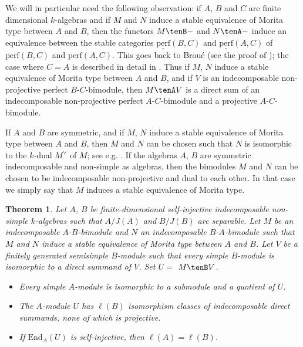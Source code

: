 \documentclass{amsart}
\theoremstyle{plain}\newtheorem{Theorem}{Theorem}[section]
\theoremstyle{plain}\newtheorem{Conjecture}[Theorem]{Conjecture}
\theoremstyle{plain}\newtheorem{Corollary}[Theorem]{Corollary}
\theoremstyle{plain}\newtheorem{Lemma}[Theorem]{Lemma}
\theoremstyle{plain}\newtheorem{Proposition}[Theorem]{Proposition}
\theoremstyle{definition}\newtheorem{Definition}[Theorem]{Definition}
\theoremstyle{definition}\newtheorem{Example}[Theorem]{Example}
\theoremstyle{definition}\newtheorem{Examples}[Theorem]{Examples}
\theoremstyle{definition}\newtheorem{Exercise}[Theorem]{Exercise}
\theoremstyle{definition}\newtheorem{Notation}[Theorem]{Notation}
\theoremstyle{definition}\newtheorem{Remark}[Theorem]{Remark}
\theoremstyle{definition}\newtheorem{Remarks}[Theorem]{Remarks}
\theoremstyle{plain}\newtheorem{Statement}[Theorem]{}
\def\End{\mathrm{End}}
\def\perf{\mathrm{perf}}
\def\perfbar{\underline{\mathrm{perf}}}
\begin{document}
We will in particular need the following observation:  if  $A$, $B$ and $C$  
are finite dimensional $k$-algebras and  if $M$ and  $N$ induce a  stable 
equivalence of Morita type between $A$ and $B$, 
then the functors  $M\tenB-$ and $N\tenA -$  induce an equivalence between 
the stable categories $\perfbar(B,C)$ and $\perfbar(A,C)$ of $\perf(B,C)$ and 
$\perf(A,C)$. This goes back to Brou\'e (see the proof of \cite[5.4]{Broue94}); the 
case where $C=A$ is described in detail in \cite[Proposition 2.17.11]{LiBookI}. 
Thus if $M$, $N$ induce a stable equivalence of
Morita type between $A$ and $B$,  and if $V$ is an indecomposable non-projective 
perfect $B$-$C$-bimodule,  then $M\tenA V$ is a direct sum of an indecomposable 
non-projective  perfect $A$-$C$-bimodule and a projective $A$-$C$-bimodule. 


If $A$ and $B$ are symmetric, and if $M$, $N$ induce a stable equivalence of 
Morita type between $A$ and $B$, then $M$ and $N$ can be chosen such that $N$ 
is isomorphic to  the $k$-dual $M^\vee$ of $M$; see e.g. 
\cite[Proposition 2.17.5]{LiBookI}.
If the algebras $A$, $B$ are symmetric indecomposable and non-simple as algebras,
then the bimodules $M$ and $N$ can be chosen to be indecomposable 
non-projective and dual to each other. In that case we simply say that $M$ 
induces a stable equivalence of Morita type. 


\begin{Theorem} \label{simpleminded-Thm}
Let $A$, $B$ be finite-dimensional self-injective indecomposable non-simple
$k$-algebras such that $A/J(A)$ and $B/J(B)$ are separable.
Let $M$ be an indecomposable $A$-$B$-bimodule and $N$ an indecomposable
$B$-$A$-bimodule such that $M$ and $N$ induce a stable equivalence
of Morita type between $A$ and $B$. Let $V$ be a finitely generated semisimple
$B$-module such that every simple $B$-module is isomorphic to a direct summand
of $V$. Set $U=$ $M\tenB V$.
\begin{itemize}
\item[{\rm (i)}]
Every simple $A$-module is isomorphic to a submodule and a quotient of $U$.
\item[{\rm (ii)}]
The $A$-module  $U$ has $\ell(B)$ isomorphism classes of indecomposable 
direct summands, none of which is projective.
\item[{\rm (iii)}]
If $\End_A(U)$ is self-injective, then $\ell(A)=\ell(B)$.
\end{itemize}
\end{Theorem}
\end{document}
